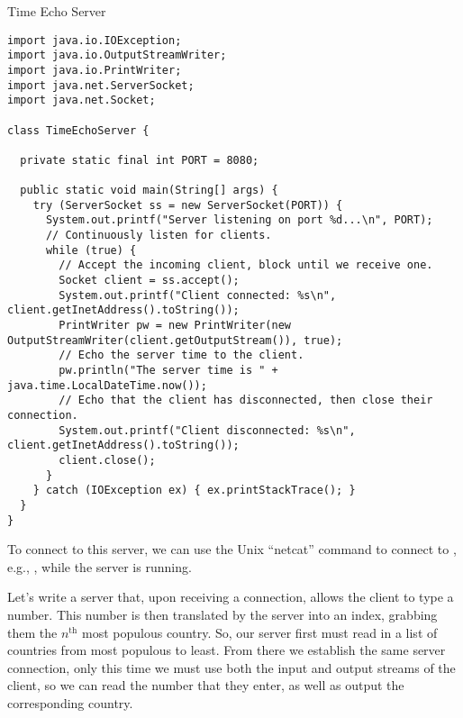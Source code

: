 \begin{cl}{Time Echo Server}
\begin{lstlisting}[language=MyJava]
import java.io.IOException;
import java.io.OutputStreamWriter;
import java.io.PrintWriter;
import java.net.ServerSocket;
import java.net.Socket;

class TimeEchoServer {

  private static final int PORT = 8080;

  public static void main(String[] args) {
    try (ServerSocket ss = new ServerSocket(PORT)) {
      System.out.printf("Server listening on port %d...\n", PORT);
      // Continuously listen for clients.
      while (true) {
        // Accept the incoming client, block until we receive one.
        Socket client = ss.accept();
        System.out.printf("Client connected: %s\n", client.getInetAddress().toString());
        PrintWriter pw = new PrintWriter(new OutputStreamWriter(client.getOutputStream()), true);
        // Echo the server time to the client.
        pw.println("The server time is " + java.time.LocalDateTime.now());
        // Echo that the client has disconnected, then close their connection.
        System.out.printf("Client disconnected: %s\n", client.getInetAddress().toString());
        client.close();
      }
    } catch (IOException ex) { ex.printStackTrace(); }
  }
}
\end{lstlisting}
\end{cl}

To connect to this server, we can use the Unix  ``netcat'' command to connect to , e.g., , while the server is running.

\example Let's write a server that, upon receiving a connection, allows the client to type a number. This number is then translated by the server into an index, grabbing them the $n^{\text{th}}$ most populous country. So, our server first must read in a list of countries from most populous to least. From there we establish the same server connection, only this time we must use both the input and output streams of the client, so we can read the number that they enter, as well as output the corresponding country. 

